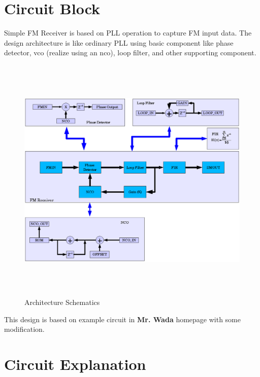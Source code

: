 \documentclass[a4paper,10pt]{article}
\begin{document}
\section{Circuit Block}
   Simple FM Receiver is based on PLL operation to capture FM input
   data. The design architecture is like ordinary PLL using basic component
   like phase detector, vco (realize using an nco), loop filter, and other
   supporting component.
\begin{figure}[H]
\center
\includegraphics[width=15cm,height=12cm]{fm_receiver.eps}
\caption {Architecture Schematics}
\end{figure}
   This design is based on example circuit in 
   \textbf{Mr. Wada} homepage with some modification.

\setcounter{figure}{0}
\section{Circuit Explanation}
\end{document}
